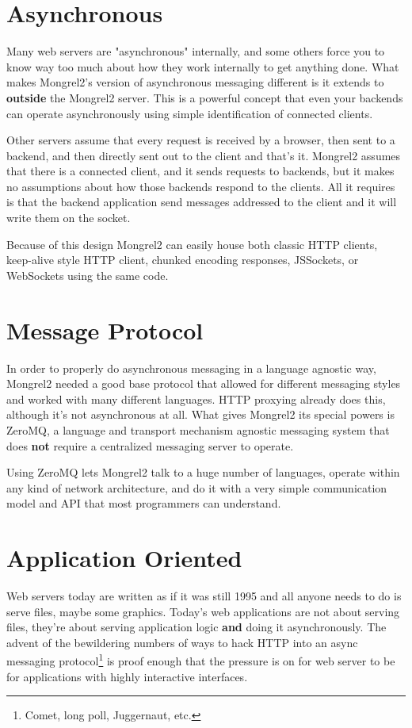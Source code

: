 \section{Asynchronous}

Many web servers are "asynchronous" internally, and some others force you to
know way too much about how they work internally to get anything done.  What makes
Mongrel2's version of asynchronous messaging different is it extends to 
{\bf outside} the Mongrel2 server.  This is a powerful concept that even your backends
can operate asynchronously using simple identification of connected clients.

Other servers assume that every request is received by a browser, then sent to a backend,
and then directly sent out to the client and that's it.  Mongrel2 assumes that there
is a connected client, and it sends requests to backends, but it makes no assumptions
about how those backends respond to the clients.  All it requires is that the backend
application send messages addressed to the client and it will write them on the
socket.

Because of this design Mongrel2 can easily house both classic HTTP clients, keep-alive
style HTTP client, chunked encoding responses, JSSockets, or WebSockets using the same
code.


\section{Message Protocol}

In order to properly do asynchronous messaging in a language agnostic way, Mongrel2
needed a good base protocol that allowed for different messaging styles and worked
with many different languages.  HTTP proxying already does this, although it's not 
asynchronous at all.  What gives Mongrel2 its special powers is ZeroMQ, a language
and transport mechanism agnostic messaging system that does {\bf not} require a 
centralized messaging server to operate.

Using ZeroMQ lets Mongrel2 talk to a huge number of languages, operate within any
kind of network architecture, and do it with a very simple communication model and
API that most programmers can understand.


\section{Application Oriented}

Web servers today are written as if it was still 1995 and all anyone needs to do
is serve files, maybe some graphics.  Today's web applications are not about serving
files, they're about serving application logic {\bf and} doing it asynchronously.
The advent of the bewildering numbers of ways to hack HTTP into an async messaging
protocol\footnote{Comet, long poll, Juggernaut, etc.} is proof enough that the 
pressure is on for web server to be for applications with highly interactive
interfaces.

